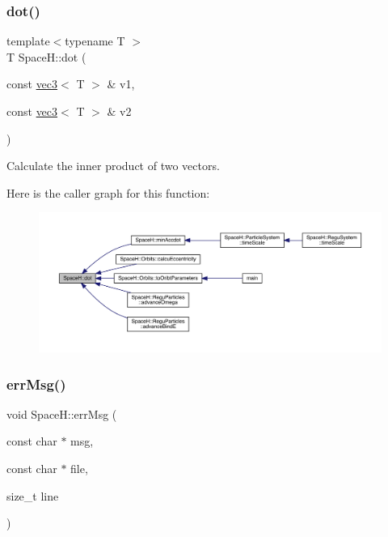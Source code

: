 \subsubsection{\texorpdfstring{dot()}{dot()}}
{\footnotesize\ttfamily template$<$typename T $>$ \\
T Space\+H\+::dot (\begin{DoxyParamCaption}\item[{const \mbox{\hyperlink{struct_space_h_1_1vec3}{vec3}}$<$ T $>$ \&}]{v1,  }\item[{const \mbox{\hyperlink{struct_space_h_1_1vec3}{vec3}}$<$ T $>$ \&}]{v2 }\end{DoxyParamCaption})\hspace{0.3cm}{\ttfamily [inline]}}



Calculate the inner product of two vectors. 

Here is the caller graph for this function\+:
\nopagebreak
\begin{figure}[H]
\begin{center}
\leavevmode
\includegraphics[width=350pt]{namespace_space_h_a8a469adb735b3a1d5c15b4a97278ad51_icgraph}
\end{center}
\end{figure}
\mbox{\label{namespace_space_h_af7bd0f1f17522b3122fa19f037a12ccc}} 
\subsubsection{\texorpdfstring{err\+Msg()}{errMsg()}}
{\footnotesize\ttfamily void Space\+H\+::err\+Msg (\begin{DoxyParamCaption}\item[{const char $\ast$}]{msg,  }\item[{const char $\ast$}]{file,  }\item[{size\+\_\+t}]{line }\end{DoxyParamCaption})}

